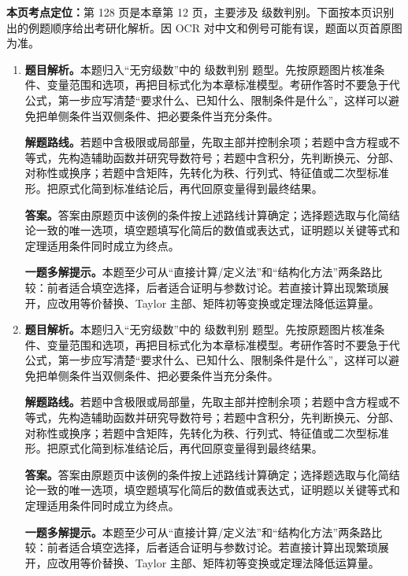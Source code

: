 \begin{solutionblock}
\textbf{本页考点定位：}第 128 页是本章第 12 页，主要涉及 级数判别。下面按本页识别出的例题顺序给出考研化解析。因 OCR 对中文和例号可能有误，题面以页首原图为准。

\begin{enumerate}[label=\textbf{例\arabic*.}, leftmargin=2.4em]

\item \textbf{题目解析。}本题归入“无穷级数”中的 级数判别 题型。先按原题图片核准条件、变量范围和选项，再把目标式化为本章标准模型。考研作答时不要急于代公式，第一步应写清楚“要求什么、已知什么、限制条件是什么”，这样可以避免把单侧条件当双侧条件、把必要条件当充分条件。

\textbf{解题路线。}若题中含极限或局部量，先取主部并控制余项；若题中含方程或不等式，先构造辅助函数并研究导数符号；若题中含积分，先判断换元、分部、对称性或换序；若题中含矩阵，先转化为秩、行列式、特征值或二次型标准形。把原式化简到标准结论后，再代回原变量得到最终结果。

\textbf{答案。}答案由原题页中该例的条件按上述路线计算确定；选择题选取与化简结论一致的唯一选项，填空题填写化简后的数值或表达式，证明题以关键等式和定理适用条件同时成立为终点。

\textbf{一题多解提示。}本题至少可从“直接计算/定义法”和“结构化方法”两条路比较：前者适合填空选择，后者适合证明与参数讨论。若直接计算出现繁琐展开，应改用等价替换、Taylor 主部、矩阵初等变换或定理法降低运算量。

\item \textbf{题目解析。}本题归入“无穷级数”中的 级数判别 题型。先按原题图片核准条件、变量范围和选项，再把目标式化为本章标准模型。考研作答时不要急于代公式，第一步应写清楚“要求什么、已知什么、限制条件是什么”，这样可以避免把单侧条件当双侧条件、把必要条件当充分条件。

\textbf{解题路线。}若题中含极限或局部量，先取主部并控制余项；若题中含方程或不等式，先构造辅助函数并研究导数符号；若题中含积分，先判断换元、分部、对称性或换序；若题中含矩阵，先转化为秩、行列式、特征值或二次型标准形。把原式化简到标准结论后，再代回原变量得到最终结果。

\textbf{答案。}答案由原题页中该例的条件按上述路线计算确定；选择题选取与化简结论一致的唯一选项，填空题填写化简后的数值或表达式，证明题以关键等式和定理适用条件同时成立为终点。

\textbf{一题多解提示。}本题至少可从“直接计算/定义法”和“结构化方法”两条路比较：前者适合填空选择，后者适合证明与参数讨论。若直接计算出现繁琐展开，应改用等价替换、Taylor 主部、矩阵初等变换或定理法降低运算量。


\end{enumerate}
\end{solutionblock}
